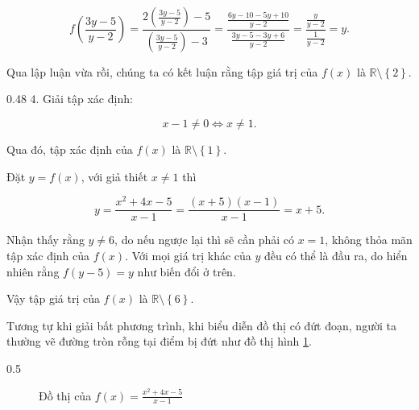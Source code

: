 \begin{equation*}
   f\left(\frac{3y - 5}{y - 2}\right) = \frac{2\left(\frac{3y - 5}{y - 2}\right) - 5}{\left(\frac{3y - 5}{y - 2}\right) - 3} = \frac{\frac{6y - 10 - 5y + 10}{y - 2}}{\frac{3y - 5 - 3y + 6}{y - 2}} = \frac{\frac{y}{y - 2}}{\frac{1}{y - 2}} = y.
\end{equation*}

Qua lập luận vừa rồi, chúng ta có kết luận rằng tập giá trị của $f(x)$ là $\mathbb{R} \setminus \left\{2\right\}$.

{
   \begin{minipageindent}{0.48\textwidth}
      4. Giải tập xác định:
      
      $$x - 1 \neq 0 \iff x \neq 1.$$
      
      Qua đó, tập xác định của $f(x)$ là $\mathbb{R} \setminus \left\{1\right\}$.
      
      Đặt $y = f(x)$, với giả thiết $x \neq 1$ thì 
      
      $$
      y = \frac{x^2 + 4x - 5}{x - 1} = \frac{(x + 5)(x - 1)}{x - 1} = x + 5.
      $$
      
      Nhận thấy rằng $y\neq 6$, do nếu ngược lại thì sẽ cần phải có $x = 1$, không thỏa mãn tập xác định của $f(x)$. Với mọi giá trị khác của $y$ đều có thể là đầu ra, do hiển nhiên rằng $f(y - 5) = y$ như biến đổi ở trên.
      
      Vậy tập giá trị của $f(x)$ là $\mathbb{R} \setminus \left\{6\right\}$.

      Tương tự khi giải bất phương trình, khi biểu diễn đồ thị có đứt đoạn, người ta thường vẽ đường tròn rỗng tại điểm bị đứt như đồ thị hình \ref{fig:ham_so_mot_bien:phan_thuc:145_1t1}.
   \end{minipageindent}
   \hfill
   \begin{minipageindent}{0.5\textwidth}
      \begin{figure}[H]
         \centering
         \caption{Đồ thị của $f(x) = \frac{x^{2} + 4 x - 5}{x - 1}$}
         \label{fig:ham_so_mot_bien:phan_thuc:145_1t1}
      \end{figure}
   \end{minipageindent}
}

